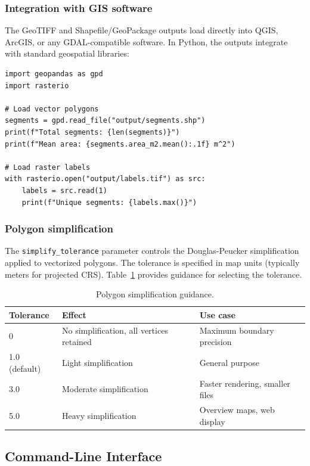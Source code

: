 \documentclass[review,11pt,authoryear]{elsarticle}
\begin{document}
\subsubsection{Integration with GIS software}

The GeoTIFF and Shapefile/GeoPackage outputs load directly into QGIS, ArcGIS, or any GDAL-compatible software. In Python, the outputs integrate with standard geospatial libraries:

\begin{lstlisting}[style=python]
import geopandas as gpd
import rasterio

# Load vector polygons
segments = gpd.read_file("output/segments.shp")
print(f"Total segments: {len(segments)}")
print(f"Mean area: {segments.area_m2.mean():.1f} m^2")

# Load raster labels
with rasterio.open("output/labels.tif") as src:
    labels = src.read(1)
    print(f"Unique segments: {labels.max()}")
\end{lstlisting}

\subsubsection{Polygon simplification}

The \texttt{simplify\_tolerance} parameter controls the Douglas-Peucker simplification applied to vectorized polygons. The tolerance is specified in map units (typically meters for projected CRS). Table~\ref{tab:simplify} provides guidance for selecting the tolerance.

\begin{table}[htbp]
\centering
\caption{Polygon simplification guidance.}
\label{tab:simplify}
\begin{tabular}{lll}
\toprule
Tolerance & Effect & Use case \\
\midrule
0 & No simplification, all vertices retained & Maximum boundary precision \\
1.0 (default) & Light simplification & General purpose \\
3.0 & Moderate simplification & Faster rendering, smaller files \\
5.0 & Heavy simplification & Overview maps, web display \\
\bottomrule
\end{tabular}
\end{table}


\subsection{Command-Line Interface}
\label{sec:cli}
\end{document}
